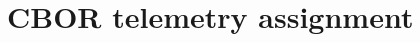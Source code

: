 \documentclass[12pt,letterpaper,openany]{book}
\begin{document}
\setcounter{chapter}{31}
\chapter{CBOR telemetry assignment}

\end{document}
